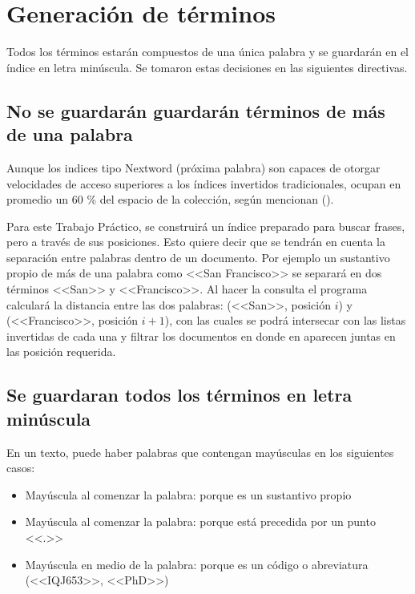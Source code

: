 
\section{Generación de términos}\label{sec:parser}
 
Todos  los términos estarán compuestos de una única palabra y se guardarán en el índice en letra minúscula. Se tomaron estas decisiones en las siguientes directivas.


\subsection{No se guardarán guardarán términos de más de una palabra}

Aunque los indices tipo Nextword (próxima palabra) son capaces de otorgar velocidades de acceso superiores a los índices invertidos tradicionales, ocupan en promedio un 60 \% del espacio de la colección, según mencionan \citet{Williams99what'snext?} (\citeyear{Williams99what'snext?}). 

Para este Trabajo Práctico, se construirá un índice preparado para buscar frases, pero a través de sus posiciones. Esto quiere decir que se tendrán en cuenta la separación entre palabras dentro de un documento. Por ejemplo un sustantivo propio de más de una palabra como <<San Francisco>> se separará en dos términos <<San>> y <<Francisco>>. Al hacer la consulta el programa calculará la distancia entre las dos palabras: (<<San>>, posición $i$) y (<<Francisco>>, posición $i+1$), con las cuales se podrá intersecar con las listas invertidas de cada una y filtrar los documentos en donde en aparecen juntas en las posición requerida.


\subsection{Se guardaran todos los términos en letra minúscula}
En un texto, puede haber palabras que contengan mayúsculas en los siguientes casos:


\begin{itemize}
\item Mayúscula al comenzar la palabra: porque es un sustantivo propio
\item Mayúscula al comenzar la palabra: porque está precedida por un punto <<.>>
\item Mayúscula en medio de la palabra: porque es un código o abreviatura (<<IQJ653>>, <<PhD>>)
\end{itemize}

